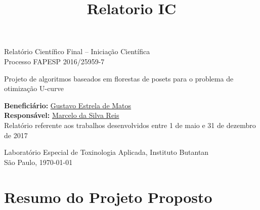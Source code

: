 \documentclass[12pt]{article}
\title{Relatorio IC}
\begin{document}
%
\doublespacing

\begin{titlepage}
    \vfill 
    \begin{center}
        {\Large Relatório Científico Final -- Iniciação Científica\\
         \bigskip
         Processo FAPESP 2016/25959-7
        }
        
        \bigskip
        \bigskip
    
        {\LARGE Projeto de algoritmos baseados em florestas de posets 
                para o problema de otimização U-curve}

        \bigskip
        \bigskip
        {\Large {\bf Beneficiário:} \href{mailto:gustavo.estrela.matos@usp.br}{Gustavo Estrela de Matos}\\ 
        
        {\bf Responsável:} \href{mailto:marcelo.reis@butantan.gov.br}{Marcelo da Silva Reis}\\

        \bigskip
        \bigskip
        \bigskip
        \bigskip
        \bigskip
        \bigskip
        \bigskip
Relatório referente aos trabalhos desenvolvidos entre 1 de maio e 31 de dezembro de 2017

        \bigskip
        \bigskip
        \bigskip
        \bigskip
        \bigskip
        \bigskip
        \bigskip

Laboratório Especial de Toxinologia Aplicada, Instituto Butantan\\
        \bigskip
        São Paulo, \today\\
        }

        \bigskip
        \bigskip

       

\end{center}
\end{titlepage}


\tableofcontents

\pagebreak



\section{Resumo do Projeto Proposto} \label{sec:resumo} %


\pagebreak
\end{document}
